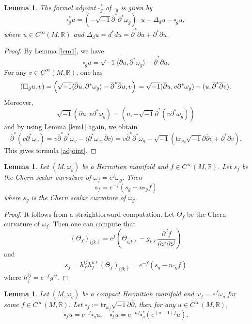 \documentclass[12pt]{amsart}
\newcommand\bp{{\bar\partial}}
\theoremstyle{plain}
\newtheorem{lemma}[thm]{Lemma}
\theoremstyle{definition}
\newcommand{\la}{\langle}
\newcommand{\ra}{\rangle}
\newcommand{\sq}{\sqrt{-1}}
\newcommand{\p}{\partial}
\renewcommand{\bar}{\overline}
\newcommand{\beq}{\begin{equation}}
\newcommand{\eeq}{\end{equation}}
\renewcommand{\bp}{\bar{\partial}}
\renewcommand{\>}{\rightarrow}
\newcommand{\R}{{\mathbb R}}
\renewcommand{\l}{\ell}
\renewcommand{\#}{\sharp}
\newcommand{\lrp}[1]{\left( #1\right)}
\newcommand{\tr}{\mathrm{tr}}
\numberwithin{equation}{section} %
\begin{document}
    \begin{lemma}The formal adjoint $\square_g^*$ of $\square_g$ is given by
        \beq
        \square_g^*u=\left(-\sq\bp^*\p^*\omega_g\right)\cdot u-\Delta_d u-\square_g u, \label{adjoint}
        \eeq
        where $u\in C^\infty(M,\R)$ and  $\Delta_d u=d^*d u=\bp^*\bp u+\p^*\p u$.
    \end{lemma}
    \begin{proof} By Lemma \ref{lem1}, we have
        \beq \square_g u=\sq\la\bp u,\p^*\omega_g\ra-\bp^*\bp u.\eeq
        \noindent
        For any $v\in C^\infty(M,\R)$, one has
        \beq (\square_g u,v)=\left(\sq\la\bp u,\p^*\omega_g\ra-\bp^*\bp u,v\right)\\
        =\sq(\bp u,v\p^*\omega_g)-(u,\bp^*\bp v). \eeq
        Moreover,
        \beq \sq(\bp u,v\p^*\omega_g)=(u,-\sq\bp^*(v\p^*\omega_g))\eeq
        and by using Lemma \ref{lem1} again, we obtain
        \beq \bp^*(v\p^*\omega_g)=v\bp^*\p^*\omega_g -\la\p^*\omega_g,\bp v\ra=v\bp^*\p^*\omega_g-\sq(\tr_{\omega_g}\sq\p\bp v+\p^*\p v).\eeq
        This gives formula \eqref{adjoint}.
    \end{proof}




        \begin{lemma}\label{lem2.5}
        Let $(M,\omega_g)$ be a Hermitian manifold and  $f\in C^\infty(M,\R)$. Let $s_f$ be the Chern scalar curvature of $\omega_f=e^f\omega_g$. Then
        \beq\label{2.3}
        s_f=e^{-f}\lrp{s_g-n\square_g f}
        \eeq
        where $s_g$ is the Chern scalar curvature of $\omega_g$.
    \end{lemma}

    \begin{proof} It follows from a straightforward computation.
        Let $\Theta_f$ be the Chern curvature of $\omega_f$. Then one can compute that
        \beq
        \lrp{\Theta_f}_{i\bar jk\bar\l}=e^f\lrp{\Theta_{i\bar jk\bar\l}-g_{k\bar\l}\frac{\p^2f}{\p z^i\p\bar z^j}}
        \eeq
        and
        \beq
        s_f=h_f^{i\bar j}h_f^{k\bar\l}\lrp{\Theta_f}_{i\bar jk\bar\l}=e^{-f}\lrp{s_g-n\square_g f}
        \eeq
        where $h^{i\bar j}_f =e^{-f}g^{i\bar j}$.
    \end{proof}

        \begin{lemma}
        Let $(M,\omega_g)$ be a compact Hermitian manifold and $\omega_f=e^f\omega_g$  for some $f\in C^\infty(M,\R)$. Let $\square_f:=\mathrm{tr}_{\omega_f}\sq\p\bar\p$, then for any $u\in C^\infty(M,\R)$,
        \beq\label{2.5}
        \square_fu=e^{-f}\square_g u,\quad \square_f^*u=e^{-nf}\square_g^*(e^{(n-1)f}u).
        \eeq
    \end{lemma}
\end{document}
